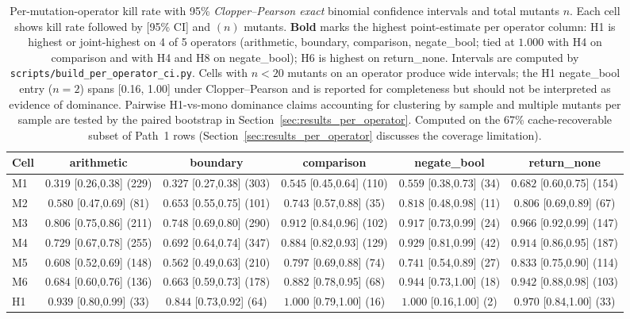 \begin{table}[!htbp]
\centering
\scriptsize
\caption{Per-mutation-operator kill rate with 95\% \emph{Clopper--Pearson exact} binomial confidence intervals and total mutants $n$. Each cell shows kill rate followed by [95\% CI] and $(n)$ mutants. \textbf{Bold} marks the highest point-estimate per operator column: H1 is highest or joint-highest on 4 of 5 operators (arithmetic, boundary, comparison, negate\_bool; tied at $1.000$ with H4 on comparison and with H4 and H8 on negate\_bool); H6 is highest on return\_none. Intervals are computed by \texttt{scripts/build\_per\_operator\_ci.py}. Cells with $n < 20$ mutants on an operator produce wide intervals; the H1 negate\_bool entry ($n = 2$) spans [0.16, 1.00] under Clopper--Pearson and is reported for completeness but should not be interpreted as evidence of dominance. Pairwise H1-vs-mono dominance claims accounting for clustering by sample and multiple mutants per sample are tested by the paired bootstrap in Section~\ref{sec:results_per_operator}. Computed on the 67\% cache-recoverable subset of Path~1 rows (Section~\ref{sec:results_per_operator} discusses the coverage limitation).}
\label{tab:per_operator_kill_rate}
\begin{tabular*}{\linewidth}{@{\extracolsep{\fill}}lccccc@{}}
\toprule
Cell & arithmetic & boundary & comparison & negate\_bool & return\_none \\
\midrule
M1 & $0.319$ [0.26,0.38] (229) & $0.327$ [0.27,0.38] (303) & $0.545$ [0.45,0.64] (110) & $0.559$ [0.38,0.73] (34) & $0.682$ [0.60,0.75] (154) \\
M2 & $0.580$ [0.47,0.69] (81) & $0.653$ [0.55,0.75] (101) & $0.743$ [0.57,0.88] (35) & $0.818$ [0.48,0.98] (11) & $0.806$ [0.69,0.89] (67) \\
M3 & $0.806$ [0.75,0.86] (211) & $0.748$ [0.69,0.80] (290) & $0.912$ [0.84,0.96] (102) & $0.917$ [0.73,0.99] (24) & $0.966$ [0.92,0.99] (147) \\
M4 & $0.729$ [0.67,0.78] (255) & $0.692$ [0.64,0.74] (347) & $0.884$ [0.82,0.93] (129) & $0.929$ [0.81,0.99] (42) & $0.914$ [0.86,0.95] (187) \\
M5 & $0.608$ [0.52,0.69] (148) & $0.562$ [0.49,0.63] (210) & $0.797$ [0.69,0.88] (74) & $0.741$ [0.54,0.89] (27) & $0.833$ [0.75,0.90] (114) \\
M6 & $0.684$ [0.60,0.76] (136) & $0.663$ [0.59,0.73] (178) & $0.882$ [0.78,0.95] (68) & $0.944$ [0.73,1.00] (18) & $0.942$ [0.88,0.98] (103) \\
H1 & $\mathbf{0.939}$ [0.80,0.99] (33) & $\mathbf{0.844}$ [0.73,0.92] (64) & $\mathbf{1.000}$ [0.79,1.00] (16) & $\mathbf{1.000}$ [0.16,1.00] (2) & $0.970$ [0.84,1.00] (33) \\

\end{tabular*}
\end{table}
